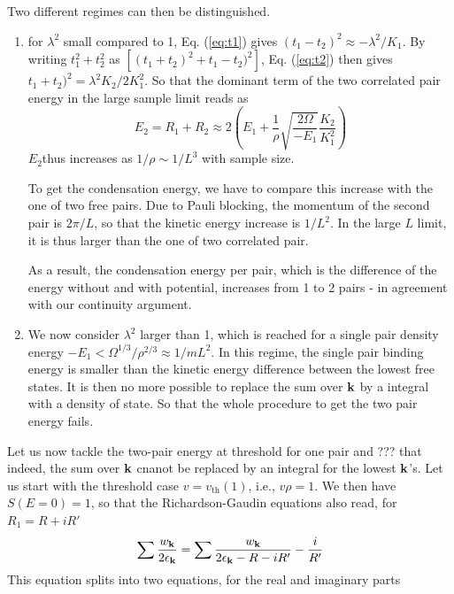 \documentclass[aps,prb,showpacs,3p,twocolumn]{elsarticle}
\begin{document}
Two different regimes can then be distinguished.  
\begin{enumerate}
\item for $\lambda^{2}$ small compared to 1, Eq. (\ref{eq:t1}) gives $(t_{1}-t_{2})^{2}\approx-\lambda^{2}/K_{1}$. By writing $t_{1}^{2}+t_{2}^{2}$ as $\left[(t_{1}+t_{2})^{2}+t_{1}-t_{2})^{2}\right]$, Eq. (\ref{eq:t2}) then gives $t_{1}+t_{2})^{2}=\lambda^{2}K_{2}/2K_{1}^{2}$.  So that the dominant term of the two correlated pair energy in the large sample limit reads as 
\begin{equation}
E_{2}=R_{1}+R_{2}\approx2\left(E_{1}+\frac{1}{\rho}\sqrt{\frac{2\Omega}{-E_{1}}}\frac{K_{2}}{K_{1}^{2}}\right)
\end{equation}
$E_{2}$thus increases as $1/\rho\sim1/L^{3}$ with sample size.

To get the condensation energy, we have to compare this increase with the one of two free pairs.  Due to Pauli blocking, the momentum of the second pair is $2\pi/L$, so that the kinetic energy increase is $1/L^{2}$.  In the large $L$ limit, it is thus larger than the one of two correlated pair. 

As a result, the condensation energy per pair, which is the difference of the energy without and with potential, increases from 1 to 2 pairs - in agreement with our continuity argument. 

\item We now consider $\lambda^{2}$ larger than 1, which is reached for a single pair density energy $-E_{1}<\Omega^{1/3}/\rho^{2/3}\approx1/mL^{2}$.  In this regime, the single pair binding energy is smaller than the kinetic energy difference between the lowest free states. It is then no more possible to replace the sum over $\mathbf{k}$ by a integral with a density of state.  So that the whole procedure to get the two pair energy fails.  

\end{enumerate}

Let us now tackle the two-pair energy at threshold for one pair and ??? that indeed, the sum over $\mathbf{k}$ cnanot be replaced by an integral for the lowest $\mathbf{k}$'s.
Let us start with the threshold case $v=v_{\text{th}}(1)$, i.e., $v\rho=1$.  We then have $S(E=0)=1$, so that the Richardson-Gaudin equations also read, for $R_1=R+iR'$
\begin{equation}
\sum\frac{w_{\mathbf{k}}}{2\epsilon_{\mathbf{k}}}=\sum\frac{w_{\mathbf{k}}}{2\epsilon_{\mathbf{k}}-R-iR'}-\frac{i}{R'}
\label{eq:}
\end{equation}
This equation splits into two equations, for the real and imaginary parts
\end{document}
